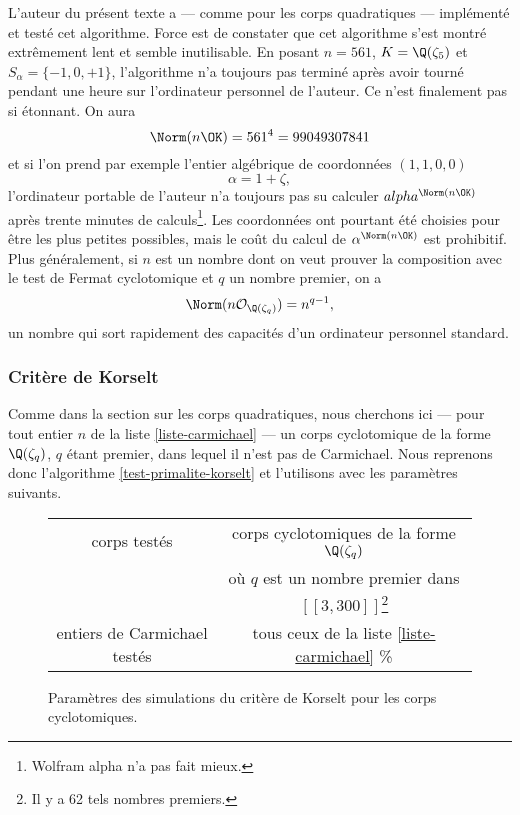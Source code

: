 L'auteur du présent texte a — comme pour les corps quadratiques — implémenté et testé cet algorithme. Force est de constater que cet algorithme s'est montré extrêmement lent et semble inutilisable. En posant $n=561$, $K = \Q(\zeta_5)$ et $S_\alpha = \{-1, 0, +1\}$, l'algorithme n'a toujours pas terminé après avoir tourné pendant une heure sur l'ordinateur personnel de l'auteur. Ce n'est finalement pas si étonnant. On aura \[\Norm(n\OK) = 561^4 = 99049307841\] et si l'on prend par exemple l'entier algébrique de coordonnées $(1, 1, 0, 0)$ \[\alpha =1 + \zeta,\] l'ordinateur portable de l'auteur n'a toujours pas su calculer $alpha^{\Norm(n\OK)}$ après trente minutes de calculs\footnote{Wolfram alpha n'a pas fait mieux.}. Les coordonnées ont pourtant été choisies pour être les plus petites possibles, mais le coût du calcul de $\alpha^{\Norm(n\OK)}$ est prohibitif. Plus généralement, si $n$ est un nombre dont on veut prouver la composition avec le test de Fermat cyclotomique et $q$ un nombre premier, on a \[\Norm(n\mathcal{O}_{\Q(\zeta_q)}) = n^{q-1},\] un nombre qui sort rapidement des capacités d'un ordinateur personnel standard. 
\subsubsection{Critère de Korselt}

Comme dans la section sur les corps quadratiques, nous cherchons ici — pour tout entier $n$ de la liste \ref{liste-carmichael} — un corps cyclotomique de la forme $\Q(\zeta_q)$, $q$ étant premier, dans lequel il n'est pas de Carmichael. Nous reprenons donc l'algorithme \ref{test-primalite-korselt} et l'utilisons avec les paramètres suivants.

\begin{figure}[h!]\label{param-korselt-cyclo}
	\begin{center}
		\begin{tabular}{|c|c|}
			\hline
			corps testés & corps cyclotomiques de la forme $\Q(\zeta_q)$ \\ & où $q$ est un nombre premier dans $[\![3, 300]\!]$\footnote{Il y a 62 tels nombres premiers.} \\\hline
			entiers de Carmichael testés & tous ceux de la liste \ref{liste-carmichael} \% \\\hline
		\end{tabular}
		\caption{Paramètres des simulations du critère de Korselt pour les corps cyclotomiques.}
	\end{center}
\end{figure}



